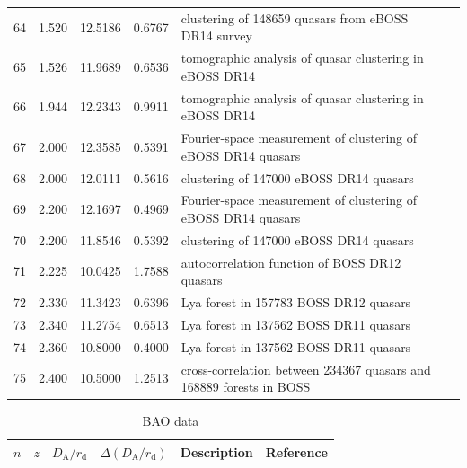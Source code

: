\begin{table}
\begin{tabular}{llllp{70mm}l}
    64 & 1.520 & 12.5186 & 0.6767 &
    clustering of 148659 quasars from eBOSS DR14 survey &
    \cite{2018MNRAS.477.1639Z} \\
    65 & 1.526 & 11.9689 & 0.6536 &
    tomographic analysis of quasar clustering in eBOSS DR14 &
    \cite{2019MNRAS.482.3497Z} \\
    66 & 1.944 & 12.2343 & 0.9911 &
    tomographic analysis of quasar clustering in eBOSS DR14 &
    \cite{2019MNRAS.482.3497Z} \\
    67 & 2.000 & 12.3585 & 0.5391 &
    Fourier-space measurement of clustering of eBOSS DR14 quasars &
    \cite{2018MNRAS.477.1528W} \\
    68 & 2.000 & 12.0111 & 0.5616 &
    clustering of 147000 eBOSS DR14 quasars &
    \cite{2018MNRAS.480.1096Z} \\
    69 & 2.200 & 12.1697 & 0.4969 &
    Fourier-space measurement of clustering of eBOSS DR14 quasars &
    \cite{2018MNRAS.477.1528W} \\
    70 & 2.200 & 11.8546 & 0.5392 &
    clustering of 147000 eBOSS DR14 quasars &
    \cite{2018MNRAS.480.1096Z} \\
    71 & 2.225 & 10.0425 & 1.7588 &
    autocorrelation function of BOSS DR12 quasars &
    \cite{2018JCAP...04..064D} \\
    72 & 2.330 & 11.3423 & 0.6396 &
    Lya forest in 157783 BOSS DR12 quasars &
    \cite{2017A+A...603A..12B} \\
    73 & 2.340 & 11.2754 & 0.6513 &
    Lya forest in 137562 BOSS DR11 quasars &
    \cite{2015A+A...574A..59D} \\
    74 & 2.360 & 10.8000 & 0.4000 &
    Lya forest in 137562 BOSS DR11 quasars &
    \cite{2015A+A...574A..59D} \\
    75 & 2.400 & 10.5000 & 1.2513 &
    cross-correlation between 234367 quasars and 168889 forests in BOSS &
    \cite{2017A+A...608A.130D} \\
  \end{tabular}
\end{table}
\begin{table}
  \caption{BAO data}
  \label{tab:2a}
  \begin{tabular}{llllp{70mm}l}
    $n$ & $z$ & $D_\mathrm{A}/r_\mathrm{d}$ & $\Delta(D_\mathrm{A}/r_\mathrm{d})$ &
    Description & Reference \\
    \hline
  \end{tabular}
\end{table}
